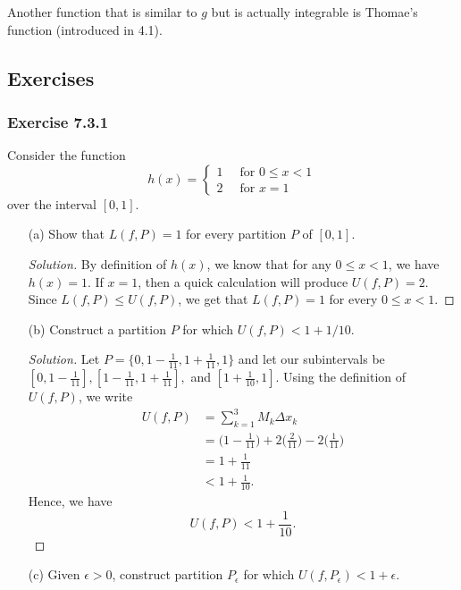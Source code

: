 Another function that is similar to \( g  \) but is actually integrable is Thomae's function (introduced in 4.1).  

\subsection{Exercises} 

\subsubsection{Exercise 7.3.1} Consider the function 
\[  h(x) = 
\begin{cases}
	1 \ &\text{ for } 0 \leq x < 1 \\
	2 \ &\text{ for } x = 1 
\end{cases} \]
over the interval \( [0,1]  \).
\begin{enumerate}
	\item[(a)] Show that \( L(f,P) = 1  \) for every partition \( P  \) of \( [0,1] \).
		\begin{proof}[Solution]
		By definition of \( h(x)  \), we know that for any \( 0 \leq x < 1  \), we have \( h(x) = 1  \). If \( x = 1  \), then a quick calculation will produce \( U(f, P) = 2  \). Since \( L(f,P) \leq U(f,P)  \), we get that \( L(f,P) = 1  \) for every \( 0 \leq x < 1  \).
		\end{proof}
	\item[(b)] Construct a partition \( P  \) for which \( U(f,P) < 1 + 1/ 10 \).
		\begin{proof}[Solution]
			Let \( P = \{ 0,  1 - \frac{ 1 }{ 11 }, 1 + \frac{ 1 }{ 11 },  1 \}  \)
			and let our subintervals be \( [0, 1 - \frac{ 1 }{ 11 } ], [1 - \frac{ 1 }{ 11 }, 1 + \frac{ 1 }{ 11 } ], \) and  \( [1 + \frac{ 1 }{ 10 }, 1] \). Using the definition of \( U(f,P)  \), we write 
			\begin{align*}
				U(f,P) &= \sum_{ k=1 }^{ 3 } M_{k } \Delta x_{k }   \\
					   &= \Big( 1 - \frac{ 1 }{ 11 }  \Big) + 2 \Big( \frac{ 2 }{ 11 }  \Big) - 2 \Big( \frac{ 1 }{ 11 }  \Big) \\
					   &= 1 + \frac{ 1 }{ 11 } \\
					   &< 1 + \frac{ 1 }{ 10 }. 
			\end{align*}
			Hence, we have 
			\[  U(f,P) < 1 + \frac{ 1 }{ 10 }. \]
		\end{proof}
	\item[(c)] Given \( \epsilon > 0  \), construct partition \( P_{\epsilon } \) for which \( U(f,P_{\epsilon }) < 1 + \epsilon \).

\end{enumerate}
